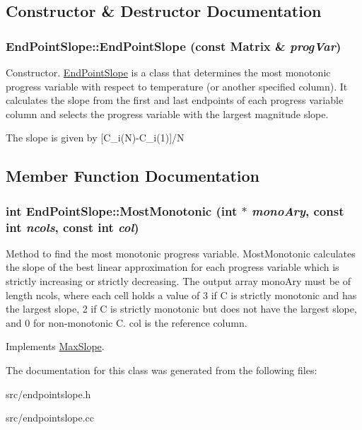 \subsection{Constructor \& Destructor Documentation}
\hypertarget{classEndPointSlope_aa1c680c5137b40a465d2433e636892ce}{
\subsubsection[{EndPointSlope}]{\setlength{\rightskip}{0pt plus 5cm}EndPointSlope::EndPointSlope (const {\bf Matrix} \& {\em progVar})}}
\label{da/d7d/classEndPointSlope_aa1c680c5137b40a465d2433e636892ce}


Constructor. \hyperlink{classEndPointSlope}{EndPointSlope} is a class that determines the most monotonic progress variable with respect to temperature (or another specified column). It calculates the slope from the first and last endpoints of each progress variable column and selects the progress variable with the largest magnitude slope.

The slope is given by \mbox{[}C\_\-i(N)-\/C\_\-i(1)\mbox{]}/N 

\subsection{Member Function Documentation}
\hypertarget{classEndPointSlope_a70417721fe8a60669a67d19a7855bef5}{
\subsubsection[{MostMonotonic}]{\setlength{\rightskip}{0pt plus 5cm}int EndPointSlope::MostMonotonic (int $\ast$ {\em monoAry}, \/  const int {\em ncols}, \/  const int {\em col})}}
\label{da/d7d/classEndPointSlope_a70417721fe8a60669a67d19a7855bef5}


Method to find the most monotonic progress variable. MostMonotonic calculates the slope of the best linear approximation for each progress variable which is strictly increasing or strictly decreasing. The output array monoAry must be of length ncols, where each cell holds a value of 3 if C is strictly monotonic and has the largest slope, 2 if C is strictly monotonic but does not have the largest slope, and 0 for non-\/monotonic C. col is the reference column. 

Implements \hyperlink{classMaxSlope}{MaxSlope}.

The documentation for this class was generated from the following files:\begin{DoxyCompactItemize}
\item 
src/endpointslope.h\item 
src/endpointslope.cc\end{DoxyCompactItemize}
